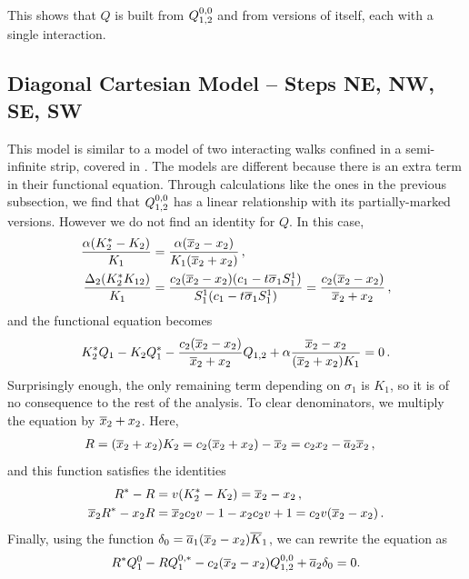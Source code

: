 This shows that $Q$ is built from $Q_{1,2}^{0,0}$ and from versions of itself, each with a single interaction.

\subsection{Diagonal Cartesian Model -- Steps NE, NW, SE, SW}
This model is similar to a model of two interacting walks confined in a semi-infinite strip, covered in \cite{wong2014confining}. The models are different because there is an extra term in their functional equation. Through calculations like the ones in the previous subsection, we find that $Q_{1,2}^{0,0}$ has a linear relationship with its partially-marked versions. However we do not find an identity for $Q$. In this case,
\begin{align}
	\frac{\alpha(K_2^\ast -K_2)}{K_1}  &= \frac{\alpha (\overline{x}_2 - x_2)}{K_1(\overline{x}_2 + x_2)}\,,\\
	\frac{\Delta_2(K_2^\ast K_{12})}{K_1} &= \frac{c_2(\overline{x}_2-x_2)(c_1- t \overline{\sigma}_1S_1^1)}{S_1^1(c_1-t\overline{\sigma}_1S_1^1)} = \frac{c_2(\overline{x}_2-x_2)}{\overline{x}_2 + x_2}\,,
\end{align}
and the functional equation becomes
\begin{align}
	K_2^\ast Q_1 - K_2 Q_1^\ast -\frac{c_2(\overline{x}_2-x_2)}{\overline{x}_2 + x_2}Q_{1,2} + \alpha\frac{\overline{x}_2-x_2}{(\overline{x}_2 + x_2)K_1}= 0\,.
\end{align}
Surprisingly enough, the only remaining term depending on $\sigma_1$ is $K_1$, so it is of no consequence to the rest of the analysis. To clear denominators, we multiply the equation by $\overline{x}_2 + x_2$. Here,
\begin{align}
	R = (\overline{x}_2 + x_2) K_2 &= c_2(\overline{x}_2 + x_2)-\overline{x}_2 = c_2x_2- \overline{a}_2\overline{x}_2\,,
\end{align}
and this function satisfies the identities
\begin{align}
	R^\ast - R &= v(K_2^\ast-K_2) = \overline{x}_2-x_2\,,\\
	\overline{x}_2R^\ast - x_2 R &= \overline{x}_2c_2v-1- x_2 c_2v + 1 = c_2v(\overline{x}_2-x_2)\,.
\end{align}
Finally, using the function $\delta_0 =  \overline{a}_1(\overline{x}_2-x_2)\overline{K}_1$, we can rewrite the equation as
\begin{align}
	\label{zero-order}
	R^\ast Q_1^0 -R Q_1^{0,\ast} - c_2(\overline{x}_2-x_2)Q_{1,2}^{0,0} + \overline{a}_2\delta_0 = 0.
\end{align}

